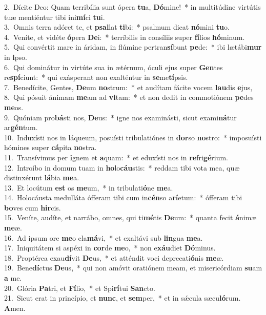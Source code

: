 {2.~}Dícite Deo: Quam terribília sunt ópera \textbf{tu}a, \textbf{Dó}mine!~* in multitúdine virtútis tuæ mentiéntur tibi ini\textbf{mí}ci \textbf{tu}i.\\
{3.~}Omnis terra adóret te, et \textbf{psal}lat \textbf{ti}bi:~* psalmum dicat \textbf{nó}mini \textbf{tu}o.\\
{4.~}Veníte, et vidéte \textbf{ó}pera \textbf{De}i:~* terríbilis in consíliis super \textbf{fí}lios \textbf{hó}minum.\\
{5.~}Qui convértit mare in áridam, in flúmine pertran\textbf{sí}bunt \textbf{pe}de:~* ibi lætábi\textbf{mur} in \textbf{i}pso.\\
{6.~}Qui dominátur in virtúte sua in ætérnum, óculi ejus super \textbf{Gen}tes re\textbf{spí}ciunt:~* qui exásperant non exalténtur in \textbf{se}me\textbf{tí}psis.\\
{7.~}Benedícite, Gentes, \textbf{De}um \textbf{no}strum:~* et audítam fácite vocem \textbf{lau}dis \textbf{e}jus,\\
{8.~}Qui pósuit ánimam \textbf{me}am ad \textbf{vi}tam:~* et non dedit in commotiónem \textbf{pe}des \textbf{me}os.\\
{9.~}Quóniam pro\textbf{bá}sti nos, \textbf{De}us:~* igne nos examinásti, sicut exami\textbf{ná}tur ar\textbf{gén}tum.\\
{10.~}Induxísti nos in láqueum, posuísti tribulatiónes in \textbf{dor}so \textbf{no}stro:~* imposuísti hómines super \textbf{cá}pita \textbf{no}stra.\\
{11.~}Transívimus per \textbf{i}gnem et \textbf{a}quam:~* et eduxísti nos in \textbf{re}fri\textbf{gé}rium.\\
{12.~}Introíbo in domum tuam in \textbf{ho}lo\textbf{cáu}stis:~* reddam tibi vota mea, quæ distinxérunt \textbf{lá}bia \textbf{me}a.\\
{13.~}Et locútum \textbf{est} os \textbf{me}um,~* in tribulati\textbf{ó}ne \textbf{me}a.\\
{14.~}Holocáusta medulláta ófferam tibi cum in\textbf{cén}so a\textbf{rí}etum:~* ófferam tibi \textbf{bo}ves cum \textbf{hir}cis.\\
{15.~}Veníte, audíte, et narrábo, omnes, qui ti\textbf{mé}tis \textbf{De}um:~* quanta fecit \textbf{á}nimæ \textbf{me}æ.\\
{16.~}Ad ipsum ore \textbf{me}o cla\textbf{má}vi,~* et exaltávi sub \textbf{lin}gua \textbf{me}a.\\
{17.~}Iniquitátem si aspéxi in \textbf{cor}de \textbf{me}o,~* non e\textbf{xáu}diet \textbf{Dó}minus.\\
{18.~}Proptérea exau\textbf{dí}vit \textbf{De}us,~* et atténdit voci deprecati\textbf{ó}nis \textbf{me}æ.\\
{19.~}Bene\textbf{dí}ctus \textbf{De}us,~* qui non amóvit oratiónem meam, et misericórdiam \textbf{su}am \textbf{a} me.\\
{20.~}Glória \textbf{Pa}tri, et \textbf{Fí}lio,~* et Spi\textbf{rí}tui \textbf{San}cto.\\
{21.~}Sicut erat in princípio, et \textbf{nunc}, et \textbf{sem}per,~* et in sǽcula sæcu\textbf{ló}rum. \textbf{A}men.\\

